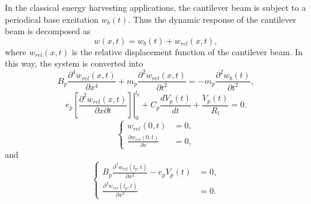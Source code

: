\documentclass{article}
\begin{document}
In the classical energy harvesting applications, the cantilever beam is subject to a periodical base excitation $w_b(t)$. Thus the dynamic response of the cantilever beam is decomposed as 
\begin{equation}
    w(x,t) = w_b(t) + w_{rel}(x,t),
\end{equation}
where $w_{rel}(x,t)$ is the relative displacement function of the cantilever beam. In this way, the system is converted into 
\begin{equation}
    B_p \frac{\partial^4 w_{rel}(x,t)}{\partial x^4} + m_p \frac{\partial^2 w_{rel}(x,t)}{\partial t^2} = - m_p \frac{\partial^2 w_{b}(t)}{\partial t^2},
\end{equation}
\begin{equation}
    e_p \left.\left[ \frac{\partial^2 w_{rel}(x,t)}{\partial x \partial t}\right]\right|_0^{l_p} + C_p \frac{d V_p(t)}{d t} + \frac{V_p(t)}{R_l} = 0.
\end{equation}
\begin{equation}
    \left\{\begin{aligned}
        w_{rel}(0,t) &= 0, \\
        \frac{\partial w_{rel}(0,t)}{\partial x} &= 0,
    \end{aligned}\right.
\end{equation}
and
\begin{equation}
    \left\{\begin{aligned}
        B_p \frac{\partial^2 w_{rel}(l_p,t)}{\partial x^2} - e_p V_p(t) &= 0, \\
        \frac{\partial^3 w_{rel}(l_p,t)}{\partial x^3} &= 0.
    \end{aligned}\right.
\end{equation}
\end{document}
